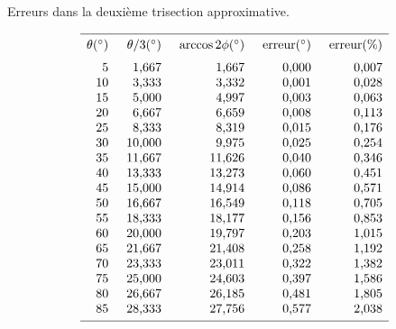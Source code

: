 \begin{table}[t]
\caption{Erreurs dans la deuxième trisection approximative.}\label{t.trisect-second-approx}
\[
%
\begin{array}{r@{\hspace{5mm}}r@{\hspace{5mm}}r@{\hspace{5mm}}r@{\hspace{5mm}}r}
\hline
\noalign{\smallskip}
\theta ({}^\circ) & \theta/3 ({}^\circ)& \arccos 2\phi ({}^\circ) & \mathrm{erreur} ({}^\circ) & \mathrm{erreur (\%)}\\
\noalign{\smallskip}\noalign{\smallskip}
  5 &    \mbox{1,667} &    \mbox{1,667}  &     \mbox{0,000} &    \mbox{0,007} \\
 10 &    \mbox{3,333} &    \mbox{3,332}  &     \mbox{0,001} &    \mbox{0,028} \\
 15 &    \mbox{5,000} &    \mbox{4,997}  &     \mbox{0,003} &    \mbox{0,063} \\
 20 &    \mbox{6,667} &    \mbox{6,659}  &     \mbox{0,008} &    \mbox{0,113} \\
 25 &    \mbox{8,333} &    \mbox{8,319}  &     \mbox{0,015} &    \mbox{0,176} \\
 30 &   \mbox{10,000} &    \mbox{9,975}  &     \mbox{0,025} &    \mbox{0,254} \\
 35 &   \mbox{11,667} &   \mbox{11,626}  &     \mbox{0,040} &    \mbox{0,346} \\
 40 &   \mbox{13,333} &   \mbox{13,273}  &     \mbox{0,060} &    \mbox{0,451} \\
 45 &   \mbox{15,000} &   \mbox{14,914}  &     \mbox{0,086} &    \mbox{0,571} \\
 50 &   \mbox{16,667} &   \mbox{16,549}  &     \mbox{0,118} &    \mbox{0,705} \\
 55 &   \mbox{18,333} &   \mbox{18,177}  &     \mbox{0,156} &    \mbox{0,853} \\
 60 &   \mbox{20,000} &   \mbox{19,797}  &     \mbox{0,203} &    \mbox{1,015} \\
 65 &   \mbox{21,667} &   \mbox{21,408}  &     \mbox{0,258} &    \mbox{1,192} \\
 70 &   \mbox{23,333} &   \mbox{23,011}  &     \mbox{0,322} &    \mbox{1,382} \\
 75 &   \mbox{25,000} &   \mbox{24,603}  &     \mbox{0,397} &    \mbox{1,586} \\
 80 &   \mbox{26,667} &   \mbox{26,185}  &     \mbox{0,481} &    \mbox{1,805} \\
 85 &   \mbox{28,333} &   \mbox{27,756}  &     \mbox{0,577} &    \mbox{2,038} \\
 \noalign{\smallskip}
 \hline
 \end{array}
\]
\end{table}


